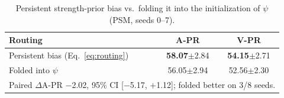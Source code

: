 \documentclass[letterpaper]{article}
\begin{document}
\begin{table}[h]
\centering
\caption{Persistent strength-prior bias vs.\ folding it into the initialization of $\psi$ (PSM, seeds 0--7).}
\small
\begin{tabular}{lcc}
\toprule
Routing & A-PR & V-PR \\
\midrule
Persistent bias (Eq.~\ref{eq:routing}) & \textbf{58.07}$\pm$2.84 & \textbf{54.15}$\pm$2.71 \\
Folded into $\psi$      & 56.05$\pm$2.94 & 52.56$\pm$2.30 \\
\midrule
\multicolumn{3}{l}{Paired $\Delta$A-PR $-$2.02, 95\% CI [$-$5.17, $+$1.12]; folded better on 3/8 seeds.} \\
\bottomrule
\end{tabular}
\end{table}
\end{document}
